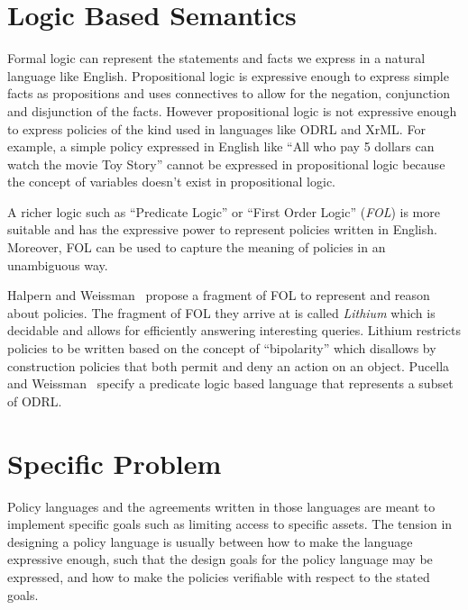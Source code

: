 \section{Logic Based Semantics}


Formal logic can represent the statements and facts we express in a natural language like English. Propositional logic is expressive enough to express simple facts as propositions and uses connectives to allow for the negation, conjunction and disjunction of the facts. However propositional logic is not expressive enough to express policies of the kind used in languages like ODRL and XrML. For example, a simple policy expressed in English like ``All who pay 5 dollars can watch the movie Toy Story'' cannot be expressed in propositional logic because the concept of  variables doesn't exist in propositional logic. 

A richer logic such as ``Predicate Logic'' or ``First Order Logic'' (\emph{FOL}) is more suitable and has the expressive power to represent policies written in English. Moreover, FOL can be used to capture the meaning of policies in an unambiguous way.

Halpern and Weissman~\cite{Halpern2008} propose a fragment of FOL to represent and reason about policies. The fragment of FOL they arrive at is called \emph{Lithium} which is decidable and allows for efficiently answering interesting queries. Lithium restricts policies to be written based on the concept of ``bipolarity'' which disallows by construction policies that both permit and deny an action on an object. Pucella and Weissman~\cite{pucella2006} specify a predicate logic based language that represents a subset of ODRL.


\section{Specific Problem}

Policy languages and the agreements written in those languages are meant to implement specific goals such as limiting access to specific assets. The tension in designing a policy language is usually between how to make the language expressive enough, such that the design goals for the policy language may be expressed, and how to make the policies verifiable with respect to the stated goals.

